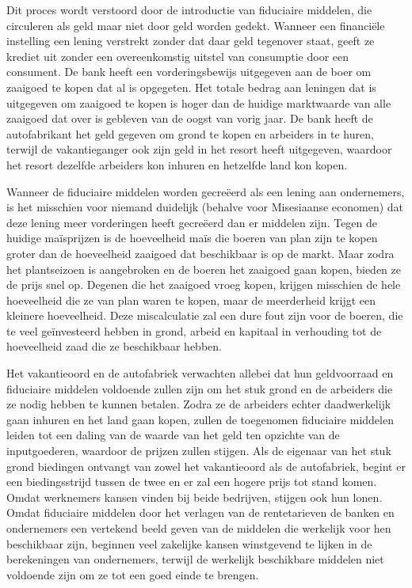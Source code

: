 Dit proces wordt verstoord door de introductie van fiduciaire middelen, die circuleren als geld maar niet door geld worden gedekt. Wanneer een financiële instelling een lening verstrekt zonder dat daar geld tegenover staat, geeft ze krediet uit zonder een overeenkomstig uitstel van consumptie door een consument. De bank heeft een vorderingsbewijs uitgegeven aan de boer om zaaigoed te kopen dat al is opgegeten. Het totale bedrag aan leningen dat is uitgegeven om zaaigoed te kopen is hoger dan de huidige marktwaarde van alle zaaigoed dat over is gebleven van de oogst van vorig jaar. De bank heeft de autofabrikant het geld gegeven om grond te kopen en arbeiders in te huren, terwijl de vakantieganger ook zijn geld in het resort heeft uitgegeven, waardoor het resort dezelfde arbeiders kon inhuren en hetzelfde land kon kopen.

Wanneer de fiduciaire middelen worden gecreëerd als een lening aan ondernemers, is het misschien voor niemand duidelijk (behalve voor Misesiaanse economen) dat deze lening meer vorderingen heeft gecreëerd dan er middelen zijn. Tegen de huidige maïsprijzen is de hoeveelheid maïs die boeren van plan zijn te kopen groter dan de hoeveelheid zaaigoed dat beschikbaar is op de markt. Maar zodra het plantseizoen is aangebroken en de boeren het zaaigoed gaan kopen, bieden ze de prijs snel op. Degenen die het zaaigoed vroeg kopen, krijgen misschien de hele hoeveelheid die ze van plan waren te kopen, maar de meerderheid krijgt een kleinere hoeveelheid. Deze miscalculatie zal een dure fout zijn voor de boeren, die te veel geïnvesteerd hebben in grond, arbeid en kapitaal in verhouding tot de hoeveelheid zaad die ze beschikbaar hebben.

Het vakantieoord en de autofabriek verwachten allebei dat hun geldvoorraad en fiduciaire middelen voldoende zullen zijn om het stuk grond en de arbeiders die ze nodig hebben te kunnen betalen. Zodra ze de arbeiders echter daadwerkelijk gaan inhuren en het land gaan kopen, zullen de toegenomen fiduciaire middelen leiden tot een daling van de waarde van het geld ten opzichte van de inputgoederen, waardoor de prijzen zullen stijgen. Als de eigenaar van het stuk grond biedingen ontvangt van zowel het vakantieoord als de autofabriek, begint er een biedingsstrijd tussen de twee en er zal een hogere prijs tot stand komen. Omdat werknemers kansen vinden bij beide bedrijven, stijgen ook hun lonen. Omdat fiduciaire middelen door het verlagen van de rentetarieven de banken en ondernemers een vertekend beeld geven van de middelen die werkelijk voor hen beschikbaar zijn, beginnen veel zakelijke kansen winstgevend te lijken in de berekeningen van ondernemers, terwijl de werkelijk beschikbare middelen niet voldoende zijn om ze tot een goed einde te brengen.

